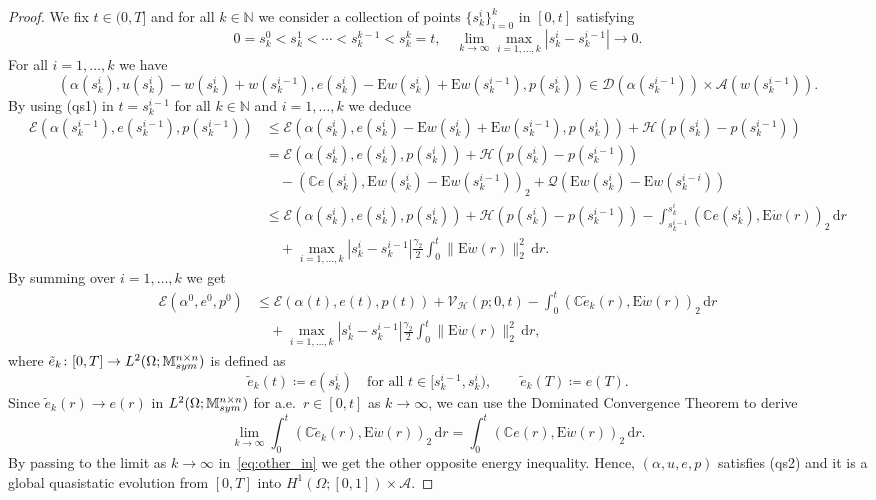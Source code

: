 \documentclass[reqno]{amsart}
\theoremstyle{definition}
\numberwithin{equation}{section}
\def\de {\mathrm{d}}
\def\N {\mathbb N}
\def\M {\mathbb M^{n\times n}_{\rm sym}}
\def\C {\mathbb C}
\def\EE {\mathrm{E}}
\begin{document}
\begin{proof}
We fix $t\in(0,T]$ and for all $k\in\N$ we consider a collection of points $\{s_k^i\}_{i=0}^k$ in $[0,t]$ satisfying
$$0=s_k^0<s_k^1<\cdots<s_k^{k-1}<s_k^k=t,\quad\lim_{k\to\infty}\max_{i=1,\dots,k}|s_k^i-s_k^{i-1}|\to 0.$$
For all $i=1,\dots,k$ we have $$(\alpha(s_k^i),u(s_k^i)-w(s_k^i)+w(s_k^{i-1}),e(s_k^i)-\EE w(s_k^i)+\EE w(s_k^{i-1}),p(s_k^i))\in \mathcal D(\alpha(s_k^{i-1}))\times \mathcal A(w(s_k^{i-1})).$$
By using (qs1) in $t=s_k^{i-1}$ for all $k\in\N$ and $i=1,\dots,k$ we deduce
 \begin{align*}
\mathcal E(\alpha(s_k^{i-1}),e(s_k^{i-1}),p(s_k^{i-1}))&\le \mathcal E(\alpha(s_k^i),e(s_k^i)-\EE w(s_k^i)+\EE w(s_k^{i-1}),p(s_k^i))+\mathcal H(p(s_k^i)-p(s_k^{i-1}))\\
&=\mathcal E(\alpha(s_k^i),e(s_k^i),p(s_k^i))+\mathcal H(p(s_k^i)-p(s_k^{i-1}))\\
&\quad-(\C e(s_k^i),\EE w(s_k^i)-\EE w(s_k^{i-1}))_2+\mathcal Q(\EE w(s_k^i)-\EE w(s_k^{i-i}))\\
&\le \mathcal E(\alpha(s_k^i),e(s_k^i),p(s_k^i))+\mathcal H(p(s_k^i)-p(s_k^{i-1}))-\int_{s_k^{i-1}}^{s_k^i}(\C e(s_k^i),\EE \dot w(r))_2\,\de r\\
&\quad +\max_{i=1,\dots,k}|s_k^i-s_k^{i-1}|\frac{\gamma_2}{2}\int_0^t\|\EE \dot w(r)\|_2^2\,\de r.
\end{align*}
By summing over $i=1,\dots,k$ we get
\begin{align}
\mathcal E(\alpha^0,e^0,p^0)&\le \mathcal E(\alpha(t),e(t),p(t))+\mathcal V_{\mathcal H}(p;0,t)-\int_0^t(\C \tilde e_k(r),\EE \dot w(r))_2\,\de r\nonumber\\
&\quad +\max_{i=1,\dots,k}|s_k^i-s_k^{i-1}|\frac{\gamma_2}{2}\int_0^t\|\EE \dot w(r)\|_2^2\,\de r,\label{eq:other_in}
\end{align}
where $\tilde e_k\colon [0,T]\to L^2(\Omega;\M)$ is defined as
$$\tilde e_k(t)\coloneqq e(s_k^i)\quad\text{for all $t\in[s_k^{i-1},s_k^i)$},\qquad \tilde e_k(T)\coloneqq e(T).$$
Since $\tilde e_k(r)\to e(r)$ in $L^2(\Omega;\M)$ for a.e.\ $r\in[0,t]$ as $k\to\infty$, we can use the Dominated Convergence Theorem to derive
\begin{equation*}
\lim_{k\to\infty}\int_0^t(\C \tilde e_k(r),\EE \dot w(r))_2\,\de r=\int_0^t(\C e(r),\EE \dot w(r))_2\,\de r.
\end{equation*}
By passing to the limit as $k\to\infty$ in~\eqref{eq:other_in} we get the other opposite energy inequality. Hence, $(\alpha,u,e,p)$ satisfies (qs2) and it is a global quasistatic evolution from $[0,T]$ into $H^1(\Omega;[0,1])\times\mathcal A$. 
\end{proof}
\end{document}
